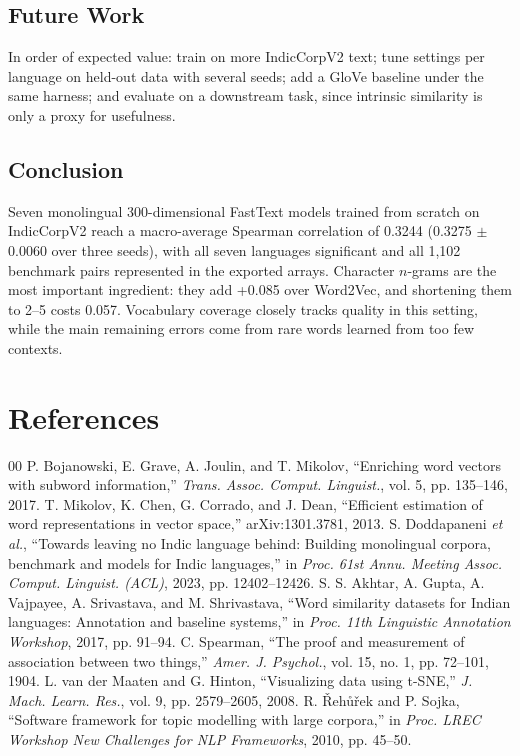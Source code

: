 \documentclass[conference,10pt]{IEEEtran}
\begin{document}
\subsection{Future Work}
In order of expected value: train on more IndicCorpV2 text; tune settings per language on held-out data with several seeds; add a GloVe baseline under the same harness; and evaluate on a downstream task, since intrinsic similarity is only a proxy for usefulness.

\subsection{Conclusion}
Seven monolingual 300-dimensional FastText models trained from scratch on IndicCorpV2 reach a macro-average Spearman correlation of 0.3244 (0.3275 $\pm$ 0.0060 over three seeds), with all seven languages significant and all 1,102 benchmark pairs represented in the exported arrays. Character $n$-grams are the most important ingredient: they add +0.085 over Word2Vec, and shortening them to 2--5 costs 0.057. Vocabulary coverage closely tracks quality in this setting, while the main remaining errors come from rare words learned from too few contexts.

\section{References}
\begingroup
\renewcommand{\section}[2]{}
\begin{thebibliography}{00}
 P. Bojanowski, E. Grave, A. Joulin, and T. Mikolov, ``Enriching word vectors with subword information,'' \textit{Trans. Assoc. Comput. Linguist.}, vol. 5, pp. 135--146, 2017.
 T. Mikolov, K. Chen, G. Corrado, and J. Dean, ``Efficient estimation of word representations in vector space,'' arXiv:1301.3781, 2013.
 S. Doddapaneni \textit{et al.}, ``Towards leaving no Indic language behind: Building monolingual corpora, benchmark and models for Indic languages,'' in \textit{Proc. 61st Annu. Meeting Assoc. Comput. Linguist. (ACL)}, 2023, pp. 12402--12426.
 S. S. Akhtar, A. Gupta, A. Vajpayee, A. Srivastava, and M. Shrivastava, ``Word similarity datasets for Indian languages: Annotation and baseline systems,'' in \textit{Proc. 11th Linguistic Annotation Workshop}, 2017, pp. 91--94.
 C. Spearman, ``The proof and measurement of association between two things,'' \textit{Amer. J. Psychol.}, vol. 15, no. 1, pp. 72--101, 1904.
 L. van der Maaten and G. Hinton, ``Visualizing data using t-SNE,'' \textit{J. Mach. Learn. Res.}, vol. 9, pp. 2579--2605, 2008.
 R. \v{R}eh\r{u}\v{r}ek and P. Sojka, ``Software framework for topic modelling with large corpora,'' in \textit{Proc. LREC Workshop New Challenges for NLP Frameworks}, 2010, pp. 45--50.
\end{thebibliography}
\endgroup
\end{document}

